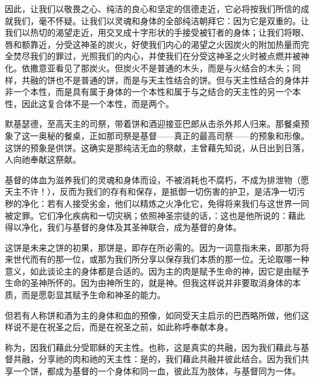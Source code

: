 因此，让我们以敬畏之心、纯洁的良心和坚定的信德走近，它必将按我们所信的成就我们，毫不怀疑。让我们以灵魂和身体的全部纯洁朝拜它：因为它是双重的。让我们以热切的渴望走近，用交叉成十字形状的手接受被钉者的身体；让我们将眼、唇和额靠近，分受这神圣的炭火，好使我们内心的渴望之火因炭火的附加热量而完全焚尽我们的罪过，光照我们的内心，并使我们在分受这神圣之火时被点燃并被神化。依撒意亚看见了那炭火。但炭火不是普通的木头，而是与火结合的木头；同样，共融的饼也不是普通的饼，而是与天主性结合的饼。但与天主性结合的身体并非一个本性，而是具有属于身体的一个本性和属于与之结合的天主性的另一个本性，因此这复合体不是一个本性，而是两个。\par

默基瑟德，至高天主的司祭，带着饼和酒迎接亚巴郎从击杀外邦人归来。那餐桌预象了这一奥秘的餐桌，正如那司祭是基督——真正的最高司祭——的预象和形像。这饼的预象是供饼。这确实是那纯洁无血的祭献，主曾藉先知说，从日出到日落，人向祂奉献这祭献。\par

基督的体血为滋养我们的灵魂和身体而设，不被消耗也不腐朽，不成为排泄物（愿天主不许！），反而为我们的存有和保存，是抵御一切伤害的护卫，是洁净一切污秽的净化：若有人接受劣金，他们以精炼之火净化它，免得将来我们与这世界一同被定罪。它们净化疾病和一切灾祸；依照神圣宗徒的话，：这也是他所说的：藉此得以净化，我们与基督的身体及其圣神联合，成为基督的身体。\par

这饼是未来之饼的初果，那饼是，即存在所必需的。因为一词意指未来，即那为将来世代而有的那一位，或那为我们所分享以保存我们本质的那一位。无论取哪一种意义，如此谈论主的身体都是合适的。因为主的肉是赋予生命的神，因它是由赋予生命的圣神所怀的。因为由神所生的，就是神。但我这样说并非要取消身体的本质，而是愿彰显其赋予生命和神圣的能力。\par

但若有人称饼和酒为主的身体和血的预像，如同受天主启示的巴西略所做，他们这样说不是在祝圣之后，而是在祝圣之前，如此称呼奉献本身。\par

称为，因我们藉此分受耶稣的天主性。也称，这是真实的共融，因为我们藉此与基督共融，分享祂的肉和祂的天主性：是的，我们藉此共融并彼此结合。因为我们共享一个饼，都成为基督的一个身体和同一血，彼此互为肢体，与基督同为一体。\par

